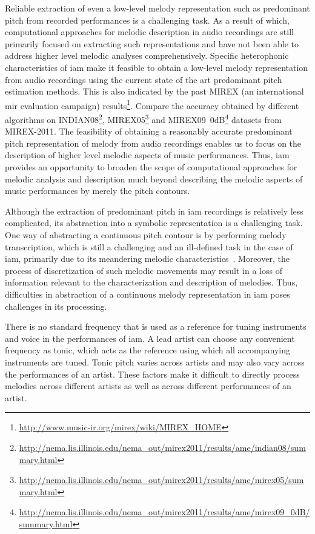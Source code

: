 Reliable extraction of even a low-level melody representation such as predominant pitch from recorded performances is a challenging task. As a result of which, computational approaches for melodic description in audio recordings are still primarily focused on extracting such representations and have not been able to address higher level melodic analyses comprehensively. Specific heterophonic characteristics of \gls{iam} make it feasible to obtain a low-level melody representation from audio recordings using the current state of the art predominant pitch estimation methods. This is also indicated by the past MIREX (an international \gls{mir} evaluation campaign) results\footnote{\url{http://www.music-ir.org/mirex/wiki/MIREX_HOME}}. Compare the accuracy obtained by different algorithms on INDIAN08\footnote{\url{http://nema.lis.illinois.edu/nema_out/mirex2011/results/ame/indian08/summary.html}}, MIREX05\footnote{\url{http://nema.lis.illinois.edu/nema_out/mirex2011/results/ame/mirex05/summary.html}} and MIREX09~0dB\footnote{\url{http://nema.lis.illinois.edu/nema_out/mirex2011/results/ame/mirex09_0dB/summary.html}} datasets from MIREX-2011. The feasibility of obtaining a reasonably accurate predominant pitch representation of melody from audio recordings enables us to focus on the description of higher level melodic aspects of music performances. Thus, \gls{iam} provides an opportunity to broaden the scope of computational approaches for melodic analysis and description much beyond describing the melodic aspects of music performances by merely the pitch contours.

Although the extraction of predominant pitch in \gls{iam} recordings is relatively less complicated, its abstraction into a symbolic representation is a challenging task. One way of abstracting a continuous pitch contour is by performing melody transcription, which is still a challenging and an ill-defined task in the case of \gls{iam}, primarily due to its meandering melodic characteristics~\citep{widdess1994involving,rao1999raga}. Moreover, the process of discretization of such melodic movements may result in a loss of information relevant to the characterization and description of melodies. Thus, difficulties in abstraction of a continuous melody representation in \gls{iam} poses challenges in its processing. 

There is no standard frequency that is used as a reference for tuning instruments and voice in the performances of \gls{iam}. A lead artist can choose any convenient frequency as tonic, which acts as the reference using which all accompanying instruments are tuned. Tonic pitch varies across artists and may also vary across the performances of an artist. These factors make it difficult to directly process melodies across different artists as well as across different performances of an artist.

